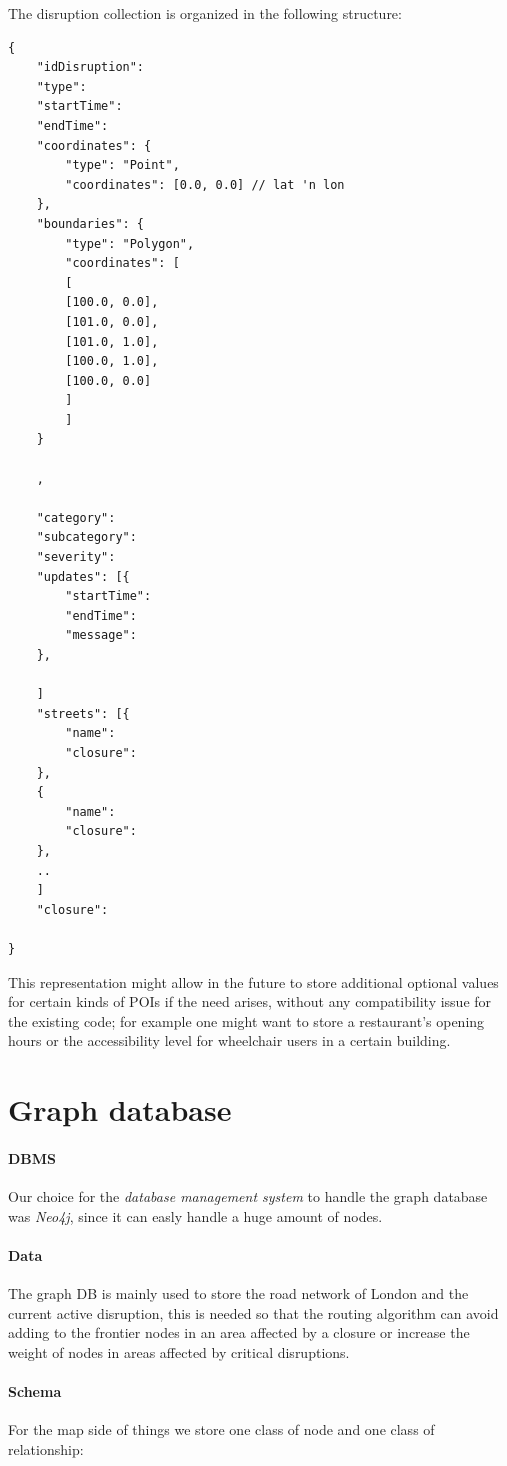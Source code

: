 The disruption collection is organized in the following structure:
\begin{lstlisting}
{
	"idDisruption":
	"type":
	"startTime":
	"endTime":
	"coordinates": {
		"type": "Point",
		"coordinates": [0.0, 0.0] // lat 'n lon
	},
	"boundaries": {
		"type": "Polygon",
		"coordinates": [
		[
		[100.0, 0.0],
		[101.0, 0.0],
		[101.0, 1.0],
		[100.0, 1.0],
		[100.0, 0.0]
		]
		]
	}
	
	,
	
	"category":
	"subcategory":
	"severity":
	"updates": [{
		"startTime":
		"endTime":
		"message":
	},
	
	]
	"streets": [{
		"name":
		"closure":
	},
	{
		"name":
		"closure":
	},
	..
	]
	"closure":
	
}
\end{lstlisting}
This representation might allow in the future to store additional optional values for certain kinds of POIs if the need arises, without any compatibility issue for the existing code; for example one might want to store a restaurant’s opening hours or the accessibility level for wheelchair users in a certain building.

\section{Graph database}

\paragraph{DBMS} Our choice for the \textit{database management system} to 
handle the graph database was \textit{Neo4j}, since it can easly handle a huge amount of nodes.


\paragraph{Data} The graph DB is mainly used to store the road network of London and the current active disruption, this is needed so that the routing algorithm can avoid adding to the frontier nodes in an area affected by a closure or increase the weight of nodes in areas affected by critical disruptions.

\paragraph{Schema}For the map side of things we store one class of node and one class of relationship:

